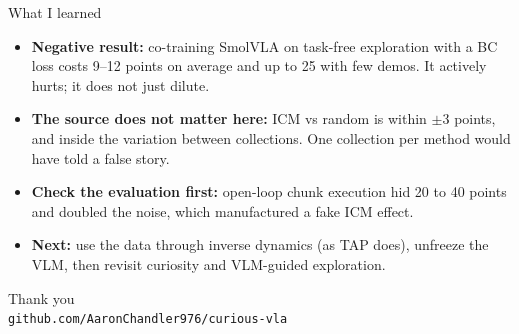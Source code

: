 \documentclass[aspectratio=169,11pt]{beamer}
\begin{document}
\begin{frame}{What I learned}
\begin{itemize}\setlength\itemsep{0.7em}
\item \textbf{Negative result:} co-training SmolVLA on task-free exploration with a BC loss costs 9--12 points on average and up to 25 with few demos. It actively hurts; it does not just dilute.
\item \textbf{The source does not matter here:} ICM vs random is within $\pm$3 points, and inside the variation between collections. One collection per method would have told a false story.
\item \textbf{Check the evaluation first:} open-loop chunk execution hid 20 to 40 points and doubled the noise, which manufactured a fake ICM effect.
\item \textbf{Next:} use the data through inverse dynamics (as TAP does), unfreeze the VLM, then revisit curiosity and VLM-guided exploration.
\end{itemize}
\end{frame}

\begin{frame}[plain]
\centering\Large Thank you\\[1em]
\normalsize\texttt{github.com/AaronChandler976/curious-vla}
\end{frame}
\end{document}
